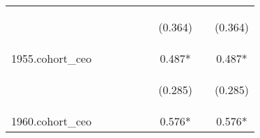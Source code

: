 \begin{center}
\begin{tabular}{lcccccccc}
\vspace{4pt} & \begin{footnotesize}\end{footnotesize} & \begin{footnotesize}\end{footnotesize} & \begin{footnotesize}\end{footnotesize} & \begin{footnotesize}\end{footnotesize} & \begin{footnotesize}\end{footnotesize} & \begin{footnotesize}(0.364)\end{footnotesize} & \begin{footnotesize}\end{footnotesize} & \begin{footnotesize}(0.364)\end{footnotesize} \\
1955.cohort\_ceo &  &  &  &  &  & 0.487* &  & 0.487* \\
\vspace{4pt} & \begin{footnotesize}\end{footnotesize} & \begin{footnotesize}\end{footnotesize} & \begin{footnotesize}\end{footnotesize} & \begin{footnotesize}\end{footnotesize} & \begin{footnotesize}\end{footnotesize} & \begin{footnotesize}(0.285)\end{footnotesize} & \begin{footnotesize}\end{footnotesize} & \begin{footnotesize}(0.285)\end{footnotesize} \\
1960.cohort\_ceo &  &  &  &  &  & 0.576* &  & 0.576* \\

\end{tabular}
\end{center}
